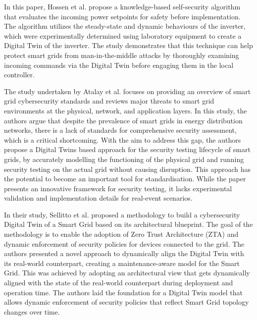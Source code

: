 In\cite{hossenDigitalTwinSelfSecurity2021} this paper, Hossen et al. propose a knowledge-based self-security algorithm that evaluates the incoming power setpoints for safety before implementation. The algorithm utilizes the steady-state and dynamic behaviours of the inverter, which were experimentally determined using laboratory equipment to create a Digital Twin of the inverter. The study demonstrates that this technique can help protect smart grids from man-in-the-middle attacks by thoroughly examining incoming commands via the Digital Twin before engaging them in the local controller.

The study undertaken by Atalay et al.\cite{atalayDigitalTwinsApproach2020} focuses on providing an overview of smart grid cybersecurity standards and reviews major threats to smart grid environments at the physical, network, and application layers. In this study, the authors argue that despite the prevalence of smart grids in energy distribution networks, there is a lack of standards for comprehensive security assessment, which is a critical shortcoming. With the aim to address this gap, the authors propose a Digital Twins based approach for the security testing lifecycle of smart grids, by accurately modelling the functioning of the physical grid and running security testing on the actual grid without causing disruption. This approach has the potential to become an important tool for standardisation. While the paper presents an innovative framework for security testing, it lacks experimental validation and implementation details for real-event scenarios.


In their study, Sellitto et al.\cite{giovannipaolosellittoEnablingZeroTrust2021} proposed a methodology to build a cybersecurity Digital Twin of a Smart Grid based on its architectural blueprint. The goal of the methodology is to enable the adoption of Zero Trust Architecture (ZTA) and dynamic enforcement of security policies for devices connected to the grid. The authors presented a novel approach to dynamically align the Digital Twin with its real-world counterpart, creating a maintenance-aware model for the Smart Grid. This was achieved by adopting an architectural view that gets dynamically aligned with the state of the real-world counterpart during deployment and operation time. The authors laid the foundation for a Digital Twin model that allows dynamic enforcement of security policies that reflect Smart Grid topology changes over time. 


